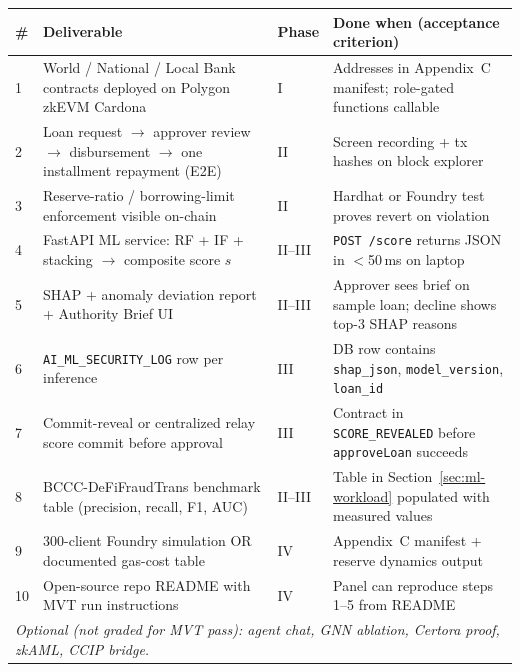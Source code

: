 \documentclass[12pt, a4paper]{report}
\newcommand{\tableheadcolor}{\rowcolor{TableHeadBg}}
\begin{document}
\begin{table}[H]
\centering
\begin{tabular}{p{0.5cm}p{4.8cm}p{1.6cm}p{6.3cm}}
\toprule
\tableheadcolor
\textbf{\#} & \textbf{Deliverable} & \textbf{Phase} & \textbf{Done when (acceptance criterion)} \\
\midrule
1 & World / National / Local Bank contracts deployed on Polygon zkEVM Cardona & I & Addresses in Appendix~C manifest; role-gated functions callable \\
2 & Loan request $\to$ approver review $\to$ disbursement $\to$ one installment repayment (E2E) & II & Screen recording + tx hashes on block explorer \\
3 & Reserve-ratio / borrowing-limit enforcement visible on-chain & II & Hardhat or Foundry test proves revert on violation \\
4 & FastAPI ML service: RF + IF + stacking $\to$ composite score $s$ & II--III & \texttt{POST /score} returns JSON in $<$50\,ms on laptop \\
5 & SHAP + anomaly deviation report + Authority Brief UI & II--III & Approver sees brief on sample loan; decline shows top-3 SHAP reasons \\
6 & \texttt{AI\_ML\_SECURITY\_LOG} row per inference & III & DB row contains \texttt{shap\_json}, \texttt{model\_version}, \texttt{loan\_id} \\
7 & Commit-reveal or centralized relay score commit before approval & III & Contract in \texttt{SCORE\_REVEALED} before \texttt{approveLoan} succeeds \\
8 & BCCC-DeFiFraudTrans benchmark table (precision, recall, F1, AUC) & II--III & Table in Section~\ref{sec:ml-workload} populated with measured values \\
9 & 300-client Foundry simulation OR documented gas-cost table & IV & Appendix~C manifest + reserve dynamics output \\
10 & Open-source repo README with MVT run instructions & IV & Panel can reproduce steps 1--5 from README \\
\multicolumn{4}{l}{\textit{Optional (not graded for MVT pass): agent chat, GNN ablation, Certora proof, zkAML, CCIP bridge.}} \\
\bottomrule
\end{tabular}
\end{table}
\end{document}
